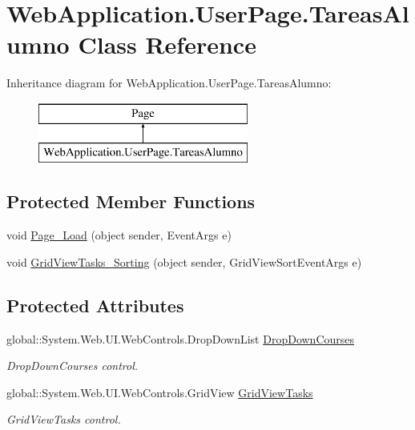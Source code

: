 \hypertarget{classWebApplication_1_1UserPage_1_1TareasAlumno}{}\section{Web\+Application.\+User\+Page.\+Tareas\+Alumno Class Reference}
\label{classWebApplication_1_1UserPage_1_1TareasAlumno}
Inheritance diagram for Web\+Application.\+User\+Page.\+Tareas\+Alumno\+:\begin{figure}[H]
\begin{center}
\leavevmode
\includegraphics[height=2.000000cm]{d8/d0a/classWebApplication_1_1UserPage_1_1TareasAlumno}
\end{center}
\end{figure}
\subsection*{Protected Member Functions}
\begin{DoxyCompactItemize}
\item 
void \mbox{\hyperlink{classWebApplication_1_1UserPage_1_1TareasAlumno_a84541b38d186ebdbd9e5057e66f12360}{Page\+\_\+\+Load}} (object sender, Event\+Args e)
\item 
void \mbox{\hyperlink{classWebApplication_1_1UserPage_1_1TareasAlumno_ad5e4de37a8532e39a243840ced95ba6d}{Grid\+View\+Tasks\+\_\+\+Sorting}} (object sender, Grid\+View\+Sort\+Event\+Args e)
\end{DoxyCompactItemize}
\subsection*{Protected Attributes}
\begin{DoxyCompactItemize}
\item 
global\+::\+System.\+Web.\+U\+I.\+Web\+Controls.\+Drop\+Down\+List \mbox{\hyperlink{classWebApplication_1_1UserPage_1_1TareasAlumno_a7fbd883512b50dbc46ea6e9cfc081c75}{Drop\+Down\+Courses}}
\begin{DoxyCompactList}\small\item\em Drop\+Down\+Courses control. \end{DoxyCompactList}\item 
global\+::\+System.\+Web.\+U\+I.\+Web\+Controls.\+Grid\+View \mbox{\hyperlink{classWebApplication_1_1UserPage_1_1TareasAlumno_ac86a63bef568e016d56b44578e6077c7}{Grid\+View\+Tasks}}
\begin{DoxyCompactList}\small\item\em Grid\+View\+Tasks control. \end{DoxyCompactList}\end{DoxyCompactItemize}
